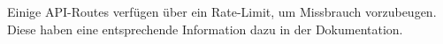 Einige API-Routes verfügen über ein Rate-Limit, um Missbrauch vorzubeugen. Diese haben eine entsprechende Information dazu in der Dokumentation.

\newpage



